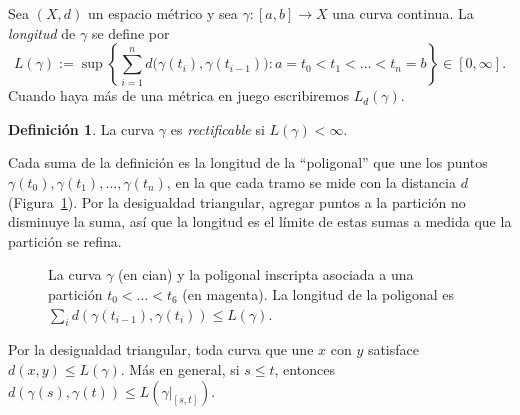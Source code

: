 \documentclass[12pt, a4paper]{amsart}
\theoremstyle{definition}
\newtheorem{definicion}[teorema]{Definición}
\theoremstyle{remark}
\begin{document}
Sea $(X,d)$ un espacio métrico y sea $\gamma\colon[a,b]\to X$ una curva continua. La \emph{longitud} de $\gamma$ se define por
\[
L(\gamma) := \sup\left\{\sum_{i=1}^n d\big(\gamma(t_i),\gamma(t_{i-1})\big) : a=t_0<t_1<\dots<t_n=b\right\}\in[0,\infty].
\]
Cuando haya más de una métrica en juego escribiremos $L_d(\gamma)$.

\begin{definicion}
La curva $\gamma$ es \emph{rectificable} si $L(\gamma)<\infty$.
\end{definicion}

Cada suma de la definición es la longitud de la ``poligonal'' que une los puntos $\gamma(t_0),\gamma(t_1),\dots,\gamma(t_n)$, en la que cada tramo se mide con la distancia $d$ (Figura~\ref{fig:poligonal}). Por la desigualdad triangular, agregar puntos a la partición no disminuye la suma, así que la longitud es el límite de estas sumas a medida que la partición se refina.

\begin{figure}[htbp]
\centering
{}
\caption{La curva $\gamma$ (en cian) y la poligonal inscripta asociada a una partición $t_0<\dots<t_6$ (en magenta). La longitud de la poligonal es $\sum_i d(\gamma(t_{i-1}),\gamma(t_i))\le L(\gamma)$.}
\label{fig:poligonal}
\end{figure}

Por la desigualdad triangular, toda curva que une $x$ con $y$ satisface $d(x,y)\le L(\gamma)$. Más en general, si $s\le t$, entonces $d(\gamma(s),\gamma(t))\le L(\gamma|_{[s,t]})$.
\end{document}
